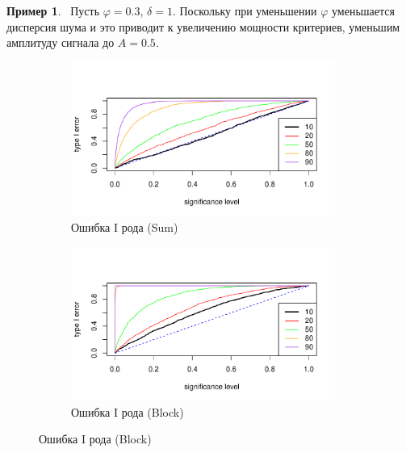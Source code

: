 \documentclass[specialist,
substylefile = spbu_report.rtx,
subf,href,colorlinks=true, 12pt]{disser}
\theoremstyle{definition}
\newtheorem{example}{Пример}
\begin{document}
\begin{example}~\label{mc-mssa_example2}
	Пусть $\varphi=0.3$, $\delta=1$. Поскольку при уменьшении $\varphi$ уменьшается дисперсия шума и это приводит к увеличению мощности критериев, уменьшим амплитуду сигнала до $A=0.5$.

	\begin{figure}[h!]
		\captionsetup[subfigure]{justification=Centering}
		\begin{subfigure}[t]{0.5\textwidth}
			\centering
			\includegraphics[width=0.95\textwidth]{img/type1error_sum_ev_phi3.pdf}
			\caption{Ошибка I рода (Sum)}
		\end{subfigure}\hspace{\fill}
		\begin{subfigure}[t]{0.5\textwidth}
			\centering
			\includegraphics[width=0.95\textwidth]{img/type1error_block_ev_phi3.pdf}
			\caption{Ошибка I рода (Block)}
		\end{subfigure}

\end{figure}
\end{example}
\end{document}
